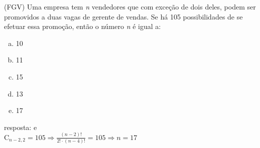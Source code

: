 \begin{ex}
 (FGV) Uma empresa tem \textit{n} vendedores que com exceção de dois deles, podem ser promovidos a duas vagas de gerente de vendas. Se há 105 possibilidades de se efetuar essa promoção, então o número \textit{n} é igual a:
    \begin{enumerate}[(a)]
    \item 10
    \item 11
    \item 15
    \item 13
    \item 17
    \end{enumerate}
      \begin{sol}
      resposta: e \\
      $\mathrm{C}_{n-2,2}=105 \Longrightarrow\frac{(n-2)!}{2!\cdot(n-4)!}=105\Longrightarrow n =17$ 
      \end{sol}
\end{ex}